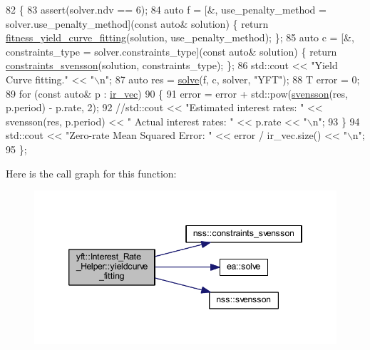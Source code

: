 \begin{DoxyCode}
82         \{
83             assert(solver.ndv == 6);
84             \textcolor{keyword}{auto} f = [&, use\_penalty\_method = solver.use\_penalty\_method](\textcolor{keyword}{const} \textcolor{keyword}{auto}& solution) \{ \textcolor{keywordflow}{return} 
      \hyperlink{classyft_1_1_interest___rate___helper_ab8f50bcc6788356b008716a44dc134b8}{fitness\_yield\_curve\_fitting}(solution, use\_penalty\_method); \};
85             \textcolor{keyword}{auto} c = [&, constraints\_type = solver.constraints\_type](\textcolor{keyword}{const} \textcolor{keyword}{auto}& solution) \{ \textcolor{keywordflow}{return} 
      \hyperlink{namespacenss_a39de3569a71e773f9da82c713eb7e6eb}{constraints\_svensson}(solution, constraints\_type); \};
86             std::cout << \textcolor{stringliteral}{"Yield Curve fitting."} << \textcolor{stringliteral}{"\(\backslash\)n"};
87             \textcolor{keyword}{auto} res = \hyperlink{namespaceea_a6450b5bf61e9fdca8b6c19267e14c560}{solve}(f, c, solver, \textcolor{stringliteral}{"YFT"});
88             T error = 0;
89             \textcolor{keywordflow}{for} (\textcolor{keyword}{const} \textcolor{keyword}{auto}& p : \hyperlink{classyft_1_1_interest___rate___helper_aaa22a1a41fd5eead9ea61136ebc8446c}{ir\_vec})
90             \{
91                 error = error + std::pow(\hyperlink{namespacenss_a71aad246261afa16f8bb1a4057570d4b}{svensson}(res, p.period) - p.rate, 2);
92                 \textcolor{comment}{//std::cout << "Estimated interest rates: " << svensson(res, p.period) << " Actual interest
       rates: " << p.rate << "\(\backslash\)n";}
93             \}
94             std::cout << \textcolor{stringliteral}{"Zero-rate Mean Squared Error: "} << error / ir\_vec.size() << \textcolor{stringliteral}{"\(\backslash\)n"};
95         \};
\end{DoxyCode}
Here is the call graph for this function\+:
\nopagebreak
\begin{figure}[H]
\begin{center}
\leavevmode
\includegraphics[width=346pt]{classyft_1_1_interest___rate___helper_a2bf0217c985329f0f32c9df92b29456c_cgraph}
\end{center}
\end{figure}


